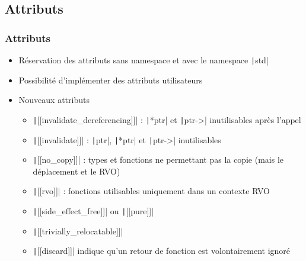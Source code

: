 \documentclass[C++.tex]{subfiles}
\begin{document}
\subsection*{Attributs}
\begin{frame}[fragile]
	\frametitle{Attributs}
	\begin{itemize}
		\item Réservation des attributs sans namespace et avec le namespace \texttt|std|


		\item Possibilité d'implémenter des attributs utilisateurs


		\item Nouveaux attributs
		\begin{itemize}
			\item \texttt|[[invalidate_dereferencing]]| : \texttt|*ptr| et \texttt|ptr->| inutilisables après l'appel


			\item \texttt|[[invalidate]]| : \texttt|ptr|, \texttt|*ptr| et \texttt|ptr->| inutilisables


			\item \texttt|[[no_copy]]| : types et fonctions ne permettant pas la copie (mais le déplacement et le RVO)
			\item \texttt|[[rvo]]| : fonctions utilisables uniquement dans un contexte RVO
			\item \texttt|[[side_effect_free]]| ou \texttt|[[pure]]|
			\item \texttt|[[trivially_relocatable]]|
			\item \texttt|[[discard]]| indique qu'un retour de fonction est volontairement ignoré

		\end{itemize}
	\end{itemize}
\end{frame}
\end{document}
